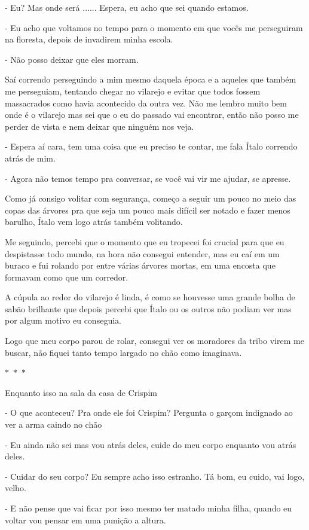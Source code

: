 - Eu? Mas onde será ...... Espera, eu acho que sei quando estamos.

- Eu acho que voltamos no tempo para o momento em que vocês me perseguiram na floresta, depois de invadirem minha escola.

- Não posso deixar que eles morram.

Saí correndo perseguindo a mim mesmo daquela época e a aqueles que também me perseguiam, tentando chegar no vilarejo e evitar que todos fossem massacrados como havia acontecido da outra vez. Não me lembro muito bem onde é o vilarejo mas sei que o eu do passado vai encontrar, então não posso me perder de vista e nem deixar que ninguém nos veja.

- Espera aí cara, tem uma coisa que eu preciso te contar, me fala Ítalo correndo atrás de mim.

- Agora não temos tempo pra conversar, se você vai vir me ajudar, se apresse.

Como já consigo volitar com segurança, começo a seguir um pouco no meio das copas das árvores pra que seja um pouco mais difícil ser notado e fazer menos barulho, Ítalo vem logo atrás também volitando.

Me seguindo, percebi que o momento que eu tropecei foi crucial para que eu despistasse todo mundo, na hora não consegui entender, mas eu caí em um buraco e fui rolando por entre várias árvores mortas, em uma encosta que formavam como que um corredor.

A cúpula ao redor do vilarejo é linda, é como se houvesse uma grande bolha de sabão brilhante que depois percebi que Ítalo ou os outros não podiam ver mas por algum motivo eu conseguia.

Logo que meu corpo parou de rolar, consegui ver os moradores da tribo virem me buscar, não fiquei tanto tempo largado no chão como imaginava.

\begin{center}
  $\ast$~$\ast$~$\ast$
\end{center}

Enquanto isso na sala da casa de Crispim

- O que aconteceu? Pra onde ele foi Crispim? Pergunta o garçom indignado ao ver a arma caindo no chão

- Eu ainda não sei mas vou atrás deles, cuide do meu corpo enquanto vou atrás deles.

- Cuidar do seu corpo? Eu sempre acho isso estranho. Tá bom, eu cuido, vai logo, velho.

- E não pense que vai ficar por isso mesmo ter matado minha filha, quando eu voltar vou pensar em uma punição a altura.

